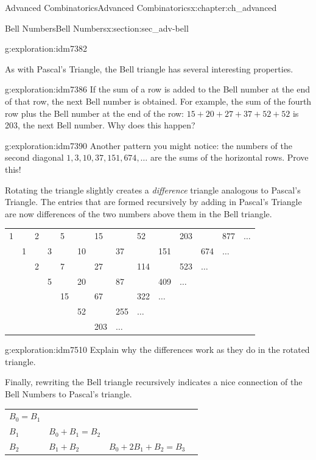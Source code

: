 \documentclass[oneside,10pt,]{book}
\numberwithin{equation}{chapter}
\begin{document}
\begin{chapterptx}{Advanced Combinatorics}{}{Advanced Combinatorics}{}{}{x:chapter:ch_advanced}
\begin{sectionptx}{Bell Numbers}{}{Bell Numbers}{}{}{x:section:sec_adv-bell}
\begin{exploration}{}{g:exploration:idm7382}
\end{exploration}
As with Pascal's Triangle, the Bell triangle has several interesting properties.%
\begin{exploration}{}{g:exploration:idm7386}%
If the sum of a row is added to the Bell number at the end of that row, the next Bell number is obtained. For example, the sum of the fourth row plus the Bell number at the end of the row: \(15 + 20 + 27 + 37 + 52 + 52\) is 203, the next Bell number.  Why does this happen?%
\end{exploration}
\begin{exploration}{}{g:exploration:idm7390}%
Another pattern you might notice: the numbers of the second diagonal \(1, 3, 10, 37, 151, 674, \ldots\) are the sums of the horizontal rows.  Prove this!%
\end{exploration}
Rotating the triangle slightly creates a \emph{difference} triangle analogous to Pascal's Triangle. The entries that are formed recursively by adding in Pascal's Triangle are now differences of the two numbers above them in the Bell triangle.%
\begin{sidebyside}{1}{0}{0}{0}%
\begin{sbspanel}{1}%
{\centering%
\begin{tabular}{llllllllllllll}
1&&2&&5&&15&&52&&203&&877&\(\ldots\)\tabularnewline[0pt]
&1&&3&&10&&37&&151&&674&\(\ldots\)&\tabularnewline[0pt]
&&2&&7&&27&&114&&523&\(\ldots\)&&\tabularnewline[0pt]
&&&5&&20&&87&&409&\(\ldots\)&&&\tabularnewline[0pt]
&&&&15&&67&&322&\(\ldots\)&&&&\tabularnewline[0pt]
&&&&&52&&255&\(\ldots\)&&&&&\tabularnewline[0pt]
&&&&&&203&\(\ldots\)&&&&&&
\end{tabular}
\par}
\end{sbspanel}%
\end{sidebyside}%
\begin{exploration}{}{g:exploration:idm7510}%
Explain why the differences work as they do in the rotated triangle.%
\end{exploration}
Finally, rewriting the Bell triangle recursively indicates a nice connection of the Bell Numbers to Pascal's triangle.%
\begin{sidebyside}{1}{0}{0}{0}%
\begin{sbspanel}{1}%
{\centering%
\begin{tabular}{llll}
\(B_{0} = B_{1}\)&&&\tabularnewline[0pt]
\(B_{1}\)&\(B_{0} + B_{1} = B_{2}\)&&\tabularnewline[0pt]
\(B_{2}\)&\(B_{1} + B_{2}\)&\(B_{0} + 2B_{1} + B_{2} = B_{3}\)&\tabularnewline[0pt]

\end{tabular}}
\end{sbspanel}
\end{sidebyside}
\end{sectionptx}
\end{chapterptx}
\end{document}
